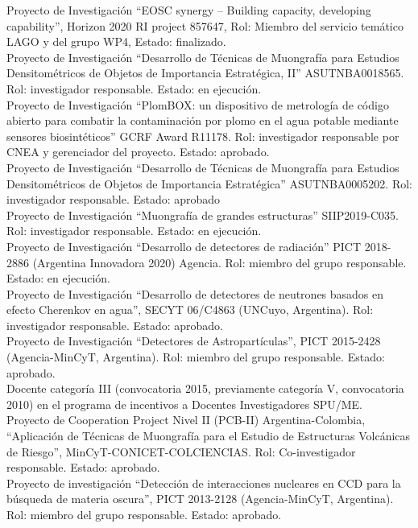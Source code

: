  Proyecto de Investigación ``EOSC synergy – Building capacity, developing capability'', Horizon 2020 RI project 857647, Rol: Miembro del servicio temático LAGO y del grupo WP4, Estado: finalizado.\\
 Proyecto de Investigación ``Desarrollo de Técnicas de Muongrafía para Estudios Densitométricos de Objetos de Importancia Estratégica, II'' ASUTNBA0018565. Rol: investigador responsable. Estado: en ejecución.\\
 Proyecto de Investigación ``PlomBOX: un dispositivo de metrología de código abierto para combatir la contaminación por plomo en el agua potable mediante sensores biosintéticos'' GCRF Award R11178. Rol: investigador responsable por CNEA y gerenciador del proyecto. Estado: aprobado.\\
 Proyecto de Investigación ``Desarrollo de Técnicas de Muongrafía para Estudios Densitométricos de Objetos de Importancia Estratégica'' ASUTNBA0005202. Rol: investigador responsable. Estado: aprobado\\
 Proyecto de Investigación ``Muongrafía de grandes estructuras'' SIIP2019-C035. Rol: investigador responsable. Estado: en ejecución.\\
 Proyecto de Investigación ``Desarrollo de detectores de radiación'' PICT 2018-2886 (Argentina Innovadora 2020) Agencia. Rol: miembro del grupo responsable. Estado: en ejecución.\\
 Proyecto de Investigación ``Desarrollo de detectores de neutrones basados en efecto Cherenkov en agua'', SECYT 06/C4863 (UNCuyo, Argentina). Rol: investigador responsable. Estado: aprobado.\\
 Proyecto de Investigación ``Detectores de Astropartículas'', PICT 2015-2428 (Agencia-MinCyT, Argentina). Rol: miembro del grupo responsable. Estado: aprobado.\\
 Docente categoría III (convocatoria 2015, previamente categoría V, convocatoria 2010) en el programa de incentivos a Docentes Investigadores SPU/ME.\\
\ifres
\else
{} Proyecto de Cooperation Project Nivel II (PCB-II) Argentina-Colombia, ``Aplicación de Técnicas de Muongrafía para el Estudio de Estructuras Volcánicas de Riesgo'', MinCyT-CONICET-COLCIENCIAS. Rol: Co-investigador responsable. Estado: aprobado.\\
 Proyecto de investigación ``Detección de interacciones nucleares en CCD para la búsqueda de materia oscura'', PICT 2013-2128 (Agencia-MinCyT, Argentina). Rol: miembro del grupo responsable. Estado: aprobado.\\

